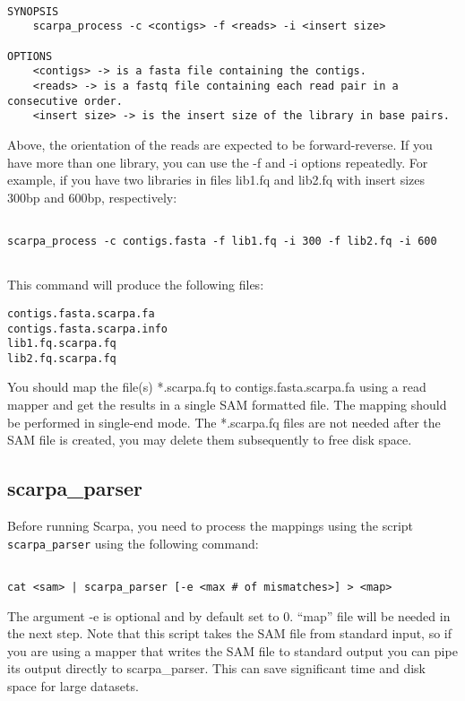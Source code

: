 \documentclass[12pt,a4paper]{report}
\begin{document}
\begin{lstlisting}

SYNOPSIS
    scarpa_process -c <contigs> -f <reads> -i <insert size>

OPTIONS
    <contigs> -> is a fasta file containing the contigs.
    <reads> -> is a fastq file containing each read pair in a consecutive order.
    <insert size> -> is the insert size of the library in base pairs.

\end{lstlisting}

Above, the orientation of the reads are expected to be forward-reverse. If you have more than one library, you can use the -f and -i options repeatedly. For example, if you have two libraries in files lib1.fq and lib2.fq with insert sizes 300bp and 600bp, respectively:

\begin{lstlisting}

scarpa_process -c contigs.fasta -f lib1.fq -i 300 -f lib2.fq -i 600


\end{lstlisting}

This command will produce the following files:

\begin{lstlisting}
contigs.fasta.scarpa.fa
contigs.fasta.scarpa.info
lib1.fq.scarpa.fq
lib2.fq.scarpa.fq
\end{lstlisting}

You should map the file(s) *.scarpa.fq to contigs.fasta.scarpa.fa using a read mapper and get the results in a single SAM formatted file. The mapping should be performed in single-end mode. The *.scarpa.fq files are not needed after the SAM file is created, you may delete them subsequently to free disk space.

\subsection{scarpa\_parser}

Before running Scarpa, you need to process the mappings using the script \texttt{scarpa\_parser} using the following command:

\begin{lstlisting}

cat <sam> | scarpa_parser [-e <max # of mismatches>] > <map>

\end{lstlisting}

The argument -e is optional and by default set to 0. ``map'' file will be needed in the next step. Note that this script takes the SAM file from standard input, so if you are using a mapper that writes the SAM file to standard output you can pipe its output directly to scarpa\_parser. This can save significant time and disk space for large datasets.
\end{document}
